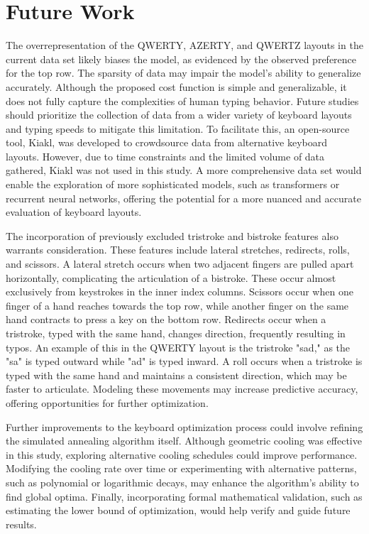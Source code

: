 \section{Future Work}
The overrepresentation of the QWERTY, AZERTY, and QWERTZ layouts in the current data set likely biases the model, as evidenced by the observed preference for the top row. The sparsity of data may impair the model's ability to generalize accurately. Although the proposed cost function is simple and generalizable, it does not fully capture the complexities of human typing behavior. Future studies should prioritize the collection of data from a wider variety of keyboard layouts and typing speeds to mitigate this limitation. To facilitate this, an open-source tool, Kiakl, was developed to crowdsource data from alternative keyboard layouts. However, due to time constraints and the limited volume of data gathered, Kiakl was not used in this study. A more comprehensive data set would enable the exploration of more sophisticated models, such as transformers or recurrent neural networks, offering the potential for a more nuanced and accurate evaluation of keyboard layouts.

The incorporation of previously excluded tristroke and bistroke features also warrants consideration. These features include lateral stretches, redirects, rolls, and scissors. A lateral stretch occurs when two adjacent fingers are pulled apart horizontally, complicating the articulation of a bistroke. These occur almost exclusively from keystrokes in the inner index columns. Scissors occur when one finger of a hand reaches towards the top row, while another finger on the same hand contracts to press a key on the bottom row. Redirects occur when a tristroke, typed with the same hand, changes direction, frequently resulting in typos. An example of this in the QWERTY layout is the tristroke "sad," as the "sa" is typed outward while "ad" is typed inward. A roll occurs when a tristroke is typed with the same hand and maintains a consistent direction, which may be faster to articulate. Modeling these movements may increase predictive accuracy, offering opportunities for further optimization. 

Further improvements to the keyboard optimization process could involve refining the simulated annealing algorithm itself. Although geometric cooling was effective in this study, exploring alternative cooling schedules could improve performance. Modifying the cooling rate over time or experimenting with alternative patterns, such as polynomial or logarithmic decays, may enhance the algorithm's ability to find global optima. Finally, incorporating formal mathematical validation, such as estimating the lower bound of optimization, would help verify and guide future results.

